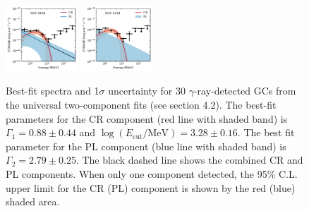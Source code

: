 \documentclass[doublespace,nopageskip]{VTthesis} %
\begin{document}
\begin{appendices}
\begin{figure}
\includegraphics[width=0.24\textwidth]{Figures/Globular/spectra/2comp_25.pdf}
\includegraphics[width=0.24\textwidth]{Figures/Globular/spectra/2comp_12.pdf}
\caption{Best-fit spectra and 1$\sigma$ uncertainty for 30 $\gamma$-ray-detected GCs from the universal two-component fits (see section 4.2). The best-fit parameters for the CR component (red line with shaded band) is $\Gamma_1 = 0.88 \pm 0.44$ and $\log(E_\mathrm{cut}/\mathrm{MeV})=3.28 \pm 0.16$. The best fit parameter for the {PL} component (blue line with shaded band) is $\Gamma_2 = 2.79 \pm 0.25$. 
The black dashed line shows the combined CR and {PL} components. When only one component detected, the 95\% C.L. upper limit for the CR ({PL}) component is shown by the red (blue) shaded area.}
\label{fig:2comp}
\end{figure}


\end{appendices}
\end{document}
